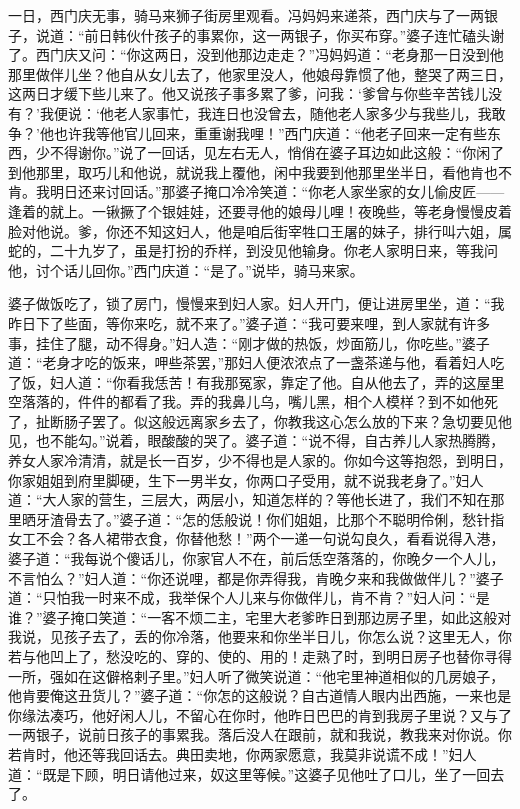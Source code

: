 一日，西门庆无事，骑马来狮子街房里观看。冯妈妈来递茶，西门庆与了一两银子，说道：“前日韩伙什孩子的事累你，这一两银子，你买布穿。”婆子连忙磕头谢了。西门庆又问：“你这两日，没到他那边走走？”冯妈妈道：“老身那一日没到他那里做伴儿坐？他自从女儿去了，他家里没人，他娘母靠惯了他，整哭了两三日，这两日才缓下些儿来了。他又说孩子事多累了爹，问我：‘爹曾与你些辛苦钱儿没有？’我便说：‘他老人家事忙，我连日也没曾去，随他老人家多少与我些儿，我敢争？’他也许我等他官儿回来，重重谢我哩！”西门庆道：“他老子回来一定有些东西，少不得谢你。”说了一回话，见左右无人，悄俏在婆子耳边如此这般：“你闲了到他那里，取巧儿和他说，就说我上覆他，闲中我要到他那里坐半日，看他肯也不肯。我明日还来讨回话。”那婆子掩口冷冷笑道：“你老人家坐家的女儿偷皮匠——逢着的就上。一锹撅了个银娃娃，还要寻他的娘母儿哩！夜晚些，等老身慢慢皮着脸对他说。爹，你还不知这妇人，他是咱后街宰牲口王屠的妹子，排行叫六姐，属蛇的，二十九岁了，虽是打扮的乔样，到没见他输身。你老人家明日来，等我问他，讨个话儿回你。”西门庆道：“是了。”说毕，骑马来家。

婆子做饭吃了，锁了房门，慢慢来到妇人家。妇人开门，便让进房里坐，道：“我昨日下了些面，等你来吃，就不来了。”婆子道：“我可要来哩，到人家就有许多事，挂住了腿，动不得身。”妇人造：“刚才做的热饭，炒面筋儿，你吃些。”婆子道：“老身才吃的饭来，呷些茶罢，”那妇人便浓浓点了一盏茶递与他，看着妇人吃了饭，妇人道：“你看我恁苦！有我那冤家，靠定了他。自从他去了，弄的这屋里空落落的，件件的都看了我。弄的我鼻儿乌，嘴儿黑，相个人模样？到不如他死了，扯断肠子罢了。似这般远离家乡去了，你教我这心怎么放的下来？急切要见他见，也不能勾。”说着，眼酸酸的哭了。婆子道：“说不得，自古养儿人家热腾腾，养女人家冷清清，就是长一百岁，少不得也是人家的。你如今这等抱怨，到明日，你家姐姐到府里脚硬，生下一男半女，你两口子受用，就不说我老身了。”妇人道：“大人家的营生，三层大，两层小，知道怎样的？等他长进了，我们不知在那里晒牙渣骨去了。”婆子道：“怎的恁般说！你们姐姐，比那个不聪明伶俐，愁针指女工不会？各人裙带衣食，你替他愁！”两个一递一句说勾良久，看看说得入港，婆子道：“我每说个傻话儿，你家官人不在，前后恁空落落的，你晚夕一个人儿，不言怕么？”妇人道：“你还说哩，都是你弄得我，肯晚夕来和我做做伴儿？”婆子道：“只怕我一时来不成，我举保个人儿来与你做伴儿，肯不肯？”妇人问：“是谁？”婆子掩口笑道：“一客不烦二主，宅里大老爹昨日到那边房子里，如此这般对我说，见孩子去了，丢的你冷落，他要来和你坐半日儿，你怎么说？这里无人，你若与他凹上了，愁没吃的、穿的、使的、用的！走熟了时，到明日房子也替你寻得一所，强如在这僻格剌子里。”妇人听了微笑说道：“他宅里神道相似的几房娘子，他肯要俺这丑货儿？”婆子道：“你怎的这般说？自古道情人眼内出西施，一来也是你缘法凑巧，他好闲人儿，不留心在你时，他昨日巴巴的肯到我房子里说？又与了一两银子，说前日孩子的事累我。落后没人在跟前，就和我说，教我来对你说。你若肯时，他还等我回话去。典田卖地，你两家愿意，我莫非说谎不成！”妇人道：“既是下顾，明日请他过来，奴这里等候。”这婆子见他吐了口儿，坐了一回去了。

